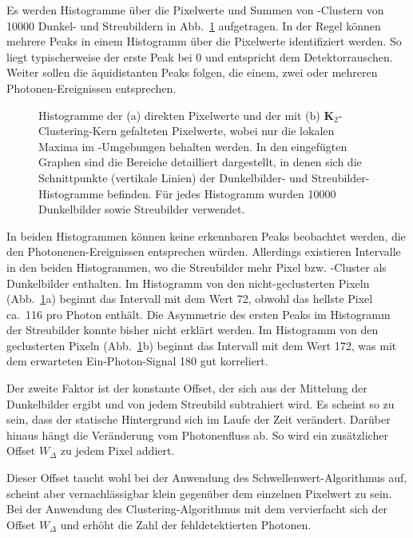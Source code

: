 \noindent
Es werden Histogramme über die Pixelwerte und Summen von -Clustern von \num{10000} Dunkel- und Streubildern in Abb.~\ref{fig:no_pr_cl_2_histograms} aufgetragen. In der Regel können mehrere Peaks in einem Histogramm über die Pixelwerte identifiziert werden. So liegt typischerweise der erste Peak bei \SI{0}{\adu} und entspricht dem Detektorrauschen. Weiter sollen die äquidistanten Peaks folgen, die einem, zwei oder mehreren Photonen-Ereignissen entsprechen.
\begin{figure}[H]
    \centering
    
    \caption{Histogramme der (a) direkten Pixelwerte und der mit (b) $\mathbf{K}_2$-Clustering-Kern gefalteten Pixelwerte, wobei nur die lokalen Maxima im -Umgebungen behalten werden. In den eingefügten Graphen sind die Bereiche detailliert dargestellt, in denen sich die Schnittpunkte (vertikale Linien) der Dunkelbilder- und Streubilder-Histogramme befinden. Für jedes Histogramm wurden \num{10000} Dunkelbilder sowie Streubilder verwendet.}
    \label{fig:no_pr_cl_2_histograms}
\end{figure}
\noindent
In beiden Histogrammen können keine erkennbaren Peaks beobachtet werden, die den Photonenen-Ereignissen entsprechen würden. Allerdings existieren Intervalle in den beiden Histogrammen, wo die Streubilder mehr Pixel bzw. -Cluster als Dunkelbilder enthalten. Im Histogramm von den nicht-geclusterten Pixeln (Abb.~\ref{fig:no_pr_cl_2_histograms}a) beginnt das Intervall mit dem Wert \SI{72}{\adu}, obwohl das hellste Pixel ca.\ \SI{116}{\adu} pro Photon enthält. Die Asymmetrie des ersten Peaks im Histogramm der Streubilder konnte bisher nicht erklärt werden.  Im Histogramm von den geclusterten Pixeln (Abb.~\ref{fig:no_pr_cl_2_histograms}b) beginnt das Intervall mit dem Wert \SI{172}{\adu}, was mit dem erwarteten Ein-Photon-Signal \SI{180}{\adu} gut korreliert. 

\noindent
Der zweite Faktor ist der konstante Offset, der sich aus der Mittelung der Dunkelbilder ergibt und von jedem Streubild subtrahiert wird. Es scheint so zu sein, dass der statische Hintergrund sich im Laufe der Zeit verändert. Darüber hinaus hängt die Veränderung vom Photonenfluss ab. So wird ein zusätzlicher Offset $W_\Delta$ zu jedem Pixel addiert.

\noindent
Dieser Offset taucht wohl bei der Anwendung des Schwellenwert-Algorithmus auf, scheint aber vernachlässigbar klein gegenüber dem einzelnen Pixelwert zu sein. Bei der Anwendung des Clustering-Algorithmus mit dem  vervierfacht sich der Offset $W_\Delta$ und erhöht die Zahl der fehldetektierten Photonen.

